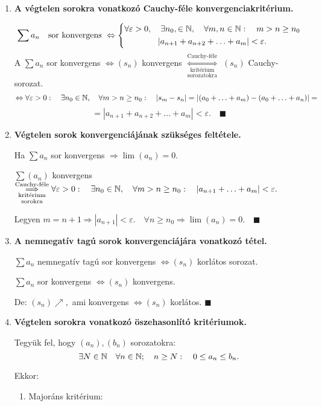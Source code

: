 \documentclass[a4paper,11.5pt]{article}
\begin{document}
\begin{enumerate}
		\item \textbf{A végtelen sorokra vonatkozó Cauchy-féle konvergenciakritérium.}
		
		\[ \sum a_n \quad \text{sor konvergens } \Leftrightarrow \left\{\begin{gathered}
		\forall \varepsilon >0,\quad  \exists n_0,  \in \mathbb{N}, \quad\forall m,n \in \mathbb{N}:\quad m> n \geq n_0\\
		|a_{n+1}+a_{n+2}+\ldots+a_m|<\varepsilon.
		\end{gathered} \right.
		\]
		\biz A $\sum a_n$ sor konvergens $\Leftrightarrow (s_n)$ konvergens $\underset{\text{sorozatokra}}{\underset{\text{kritérium}}{\overset{\text{Cauchy-féle}}{\Longleftrightarrow}}}$ $(s_n)$ Cauchy-sorozat.
		\[ \Leftrightarrow \forall\varepsilon>0:\quad \exists n_0\in \mathbb{N}, \quad\forall m>n\geq n_0: \quad |s_m-s_n|= |(a_0+\ldots+a_m)-(a_0+\ldots+a_n)|=\] \[=|a_{n+1}+a_{n+2}+\ldots+a_m|<\varepsilon. \quad\blacksquare \]
		
		\item \textbf{Végtelen sorok konvergenciájának szükséges feltétele.}
		
		Ha $\sum a_n$ sor konvergens $\Rightarrow \lim(a_n)=0$.
		
		\biz $\sum(a_n)$ konvergens $\underset{\text{sorokra}}{\underset{\text{kritérium}}{\overset{\text{Cauchy-féle}}{\Longrightarrow}}} \forall \varepsilon >0: \quad \exists n_0 \in \mathbb{N}, \quad\forall m>n\geq n_0: \quad |a_{n+1}+\ldots+a_m|<\varepsilon.$
		
		Legyen $m=n+1 \Rightarrow |a_{n+1}|<\varepsilon. \quad \forall n\geq n_0 \Rightarrow \lim(a_n)=0. \quad\blacksquare$
		
		\item\textbf{A nemnegatív tagú sorok konvergenciájára vonatkozó tétel.}
		
		$\sum a_n $ nemnegatív tagú sor konvergens $\Leftrightarrow (s_n)$ korlátos sorozat.
		
		\biz $\sum a_n $ sor konvergens $\Leftrightarrow (s_n)$ konvergens.
		
		De: $(s_n)\nearrow,$ ami konvergens $\Leftrightarrow (s_n)$ korlátos. $\blacksquare$
		
		\item \textbf{Végtelen sorokra vonatkozó öszehasonlító kritériumok.}
		
		Tegyük fel, hogy $(a_n), (b_n)$ sorozatokra: \quad\[\exists N\in \mathbb{N} \quad \forall n \in \mathbb{N}; \quad n\geq N: \quad 0\leq a_n \leq b_n.\]
		
		Ekkor: 
		\begin{enumerate}
			\item Majoráns kritérium:
			

\end{enumerate}
\end{enumerate}
\end{document}

